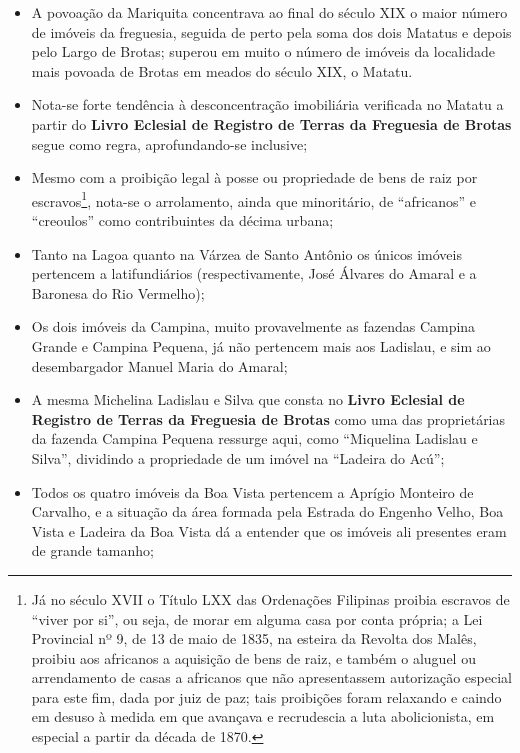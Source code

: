 \begin{itemize}
\item A povoação da Mariquita concentrava ao final do século XIX o maior número de imóveis da freguesia, seguida de perto pela soma dos dois Matatus e depois pelo Largo de Brotas; superou em muito o número de imóveis da localidade mais povoada de Brotas em meados do século XIX, o Matatu.
\item Nota-se forte tendência à desconcentração imobiliária verificada no Matatu a partir do \textbf{Livro Eclesial de Registro de Terras da Freguesia de Brotas} segue como regra, aprofundando-se inclusive;
\item Mesmo com a proibição legal à posse ou propriedade de bens de raiz por escravos\footnote{Já no século XVII o Título LXX das Ordenações Filipinas proibia escravos de ``viver por si'', ou seja, de morar em alguma casa por conta própria; a Lei Provincial nº 9, de 13 de maio de 1835, na esteira da Revolta dos Malês, proibiu aos africanos a aquisição de bens de raiz, e também o aluguel ou arrendamento de casas a africanos que não apresentassem autorização especial para este fim, dada por juiz de paz; tais proibições foram relaxando e caindo em desuso à medida em que avançava e recrudescia a luta abolicionista, em especial a partir da década de 1870.}, nota-se o arrolamento, ainda que minoritário, de ``africanos'' e ``creoulos'' como contribuintes da décima urbana;
\item Tanto na Lagoa quanto na Várzea de Santo Antônio os únicos imóveis pertencem a latifundiários (respectivamente, José Álvares do Amaral e a Baronesa do Rio Vermelho);
\item Os dois imóveis da Campina, muito provavelmente as fazendas Campina Grande e Campina Pequena, já não pertencem mais aos Ladislau, e sim ao desembargador Manuel Maria do Amaral;
\item A mesma Michelina Ladislau e Silva que consta no \textbf{Livro Eclesial de Registro de Terras da Freguesia de Brotas} como uma das proprietárias da fazenda Campina Pequena ressurge aqui, como ``Miquelina Ladislau e Silva'', dividindo a propriedade de um imóvel na ``Ladeira do Acú'';
\item Todos os quatro imóveis da Boa Vista pertencem a Aprígio Monteiro de Carvalho, e a situação da área formada pela Estrada do Engenho Velho, Boa Vista e Ladeira da Boa Vista dá a entender que os imóveis ali presentes eram de grande tamanho;
\end{itemize}